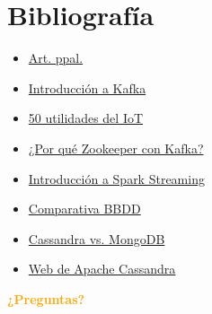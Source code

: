 \documentclass[dvipsnames]{beamer}
\begin{document}
        	
	\section{Bibliografía}
	
	\begin{frame}
		\begin{itemize}
		\item \href{https://www.infoq.com/articles/traffic-data-monitoring-iot-kafka-and-spark-streaming}{Art. ppal.}
                \item \href{http://kafka.apache.org/intro}{Introducción a Kafka}
                \item \href{http://www.libelium.com/resources/top_50_iot_sensor_applications_ranking/}{50 utilidades del IoT}
                \item \href{https://www.quora.com/What-is-the-actual-role-of-ZooKeeper-in-Kafka}{¿Por qué Zookeeper con Kafka?}
                \item \href{http://spark.apache.org/docs/latest/streaming-programming-guide.html}{Introducción a Spark Streaming}
                \item \href{http://www.datastax.com/nosql-databases/benchmarks-cassandra-vs-mongodb-vs-Hbase}{Comparativa BBDD}
                \item \href{https://scalegrid.io/blog/cassandra-vs-mongodb/}{Cassandra vs. MongoDB}
                \item \href{http://cassandra.apache.org/}{Web de Apache Cassandra}
		\end{itemize}
	\end{frame}
	
	\begin{frame}[plain]
		\begin{center}
			\textcolor{orange}{\textbf{¿Preguntas?}}
		\end{center}
	\end{frame}
	
	
\end{document}
